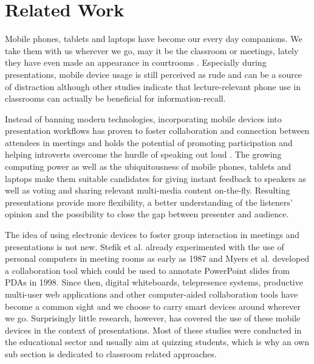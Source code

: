 \chapter{Related Work}
\label{cha:related-work}

Mobile phones, tablets and laptops have become our every day companions. We take them with us wherever we go, may it be the classroom or meetings, lately they have even made an appearance in courtrooms \cite{Farrell:TrialByTablet}. Especially during presentations, mobile device usage is still perceived as rude and can be a source of distraction \cite{Bohmer:SmartphoneUseRude, Bajko:ComparativePerceptionSmartphoneMeeting, Kuznekoff:ImpactPhoneStudentLearning} although other studies indicate that lecture-relevant phone use in classrooms can actually be beneficial \cite{Kuznekoff:MobilePhoneClassroomTwitter} for information-recall.

Instead of banning modern technologies, incorporating mobile devices into presentation workflows has proven to foster collaboration and connection between attendees in meetings \cite{Bohmer:SmartphoneUseRude} and holds the potential of promoting participation and helping introverts overcome the hurdle of speaking out loud \cite{Bry:Backstage}. The growing computing power as well as the ubiquitousness of mobile phones, tablets and laptops make them suitable candidates for giving instant feedback to speakers as well as voting and sharing relevant multi-media content on-the-fly. Resulting presentations provide more flexibility, a better understanding of the listeners' opinion and the possibility to close the gap between presenter and audience.

The idea of using electronic devices to foster group interaction in meetings and presentations is not new. Stefik et al. \cite{Stefik:BeyondTheChalkboard} already experimented with the use of personal computers in meeting rooms as early as 1987 and Myers et al. \cite{Myers:CollaborationPDAs} developed a collaboration tool which could be used to annotate PowerPoint slides from PDAs in 1998. Since then, digital whiteboards, telepresence systems, productive multi-user web applications and other computer-aided collaboration tools have become a common sight and we choose to carry smart devices around wherever we go. Surprisingly little research, however, has covered the use of these mobile devices in the context of presentations. Most of these studies were conducted in the educational sector and usually aim at quizzing students, which is why an own sub section is dedicated to classroom related approaches. 

